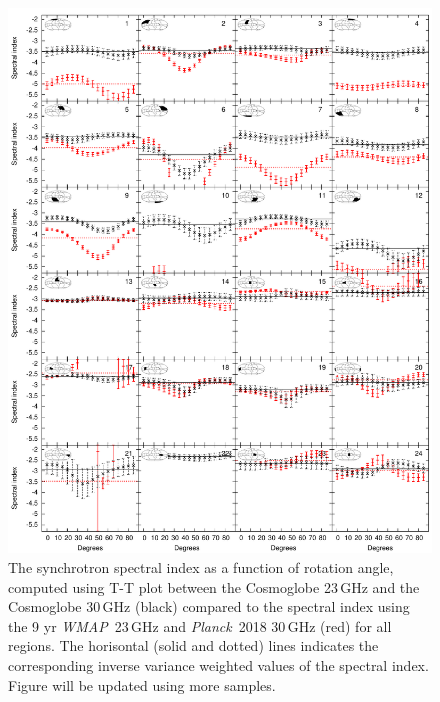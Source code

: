\documentclass[twocolumn]{../../common/aa}
\def\WMAP{\emph{WMAP}}
\def\Planck{\emph{Planck}}
\newcommand{\red}[0]{\color{red}}
\begin{document}
\begin{figure}
        \centering
        \includegraphics[width=\linewidth]{figures/cos30_ut_big_multialphaplot_converted.pdf}
        \caption{The synchrotron spectral index as a function of rotation angle, computed using T-T plot between the Cosmoglobe 23\,GHz and the Cosmoglobe 30\,GHz (black) compared to the spectral index using the 9 yr \WMAP\ 23\,GHz and \Planck\ 2018 30\,GHz (red) for all regions. The horisontal (solid and dotted) lines indicates the corresponding inverse variance weighted values of the spectral index. {\red Figure will be updated using more samples.}}
        \label{fig:cos30_beta_bigalpha}
\end{figure}
\end{document}
